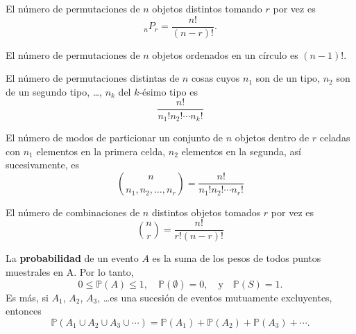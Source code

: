 \begin{theorem}[]
El número de permutaciones de $n$ objetos distintos tomando $r$ por vez es
\begin{equation*}
{}_nP_{r}=\frac{n!}{\left(n-r\right)!}.
\end{equation*}
\end{theorem}

\begin{theorem}[]
El número de permutaciones de $n$ objetos ordenados en un círculo es $(n-1)!$.
\end{theorem}

\begin{theorem}[]
El número de permutaciones distintas de $n$ cosas cuyos $n_1$ son de un tipo, $n_2$ son de un segundo tipo, \ldots, $n_k$ del $k$-ésimo tipo es
\begin{equation*}
\frac{n!}{n_1!n_2!\cdots n_k!}
\end{equation*}
\end{theorem}

\begin{theorem}
El número de modos de particionar un conjunto de $n$ objetos dentro de $r$ celadas con $n_1$ elementos en la primera celda, $n_2$ elementos en la segunda, así sucesivamente, es
\begin{equation*}
\binom{n}{n_1,n_2,\ldots,n_r}=\frac{n!}{n_1! n_2! \cdots n_r!}
\end{equation*}
\end{theorem}

\begin{theorem}[]
El número de combinaciones de $n$ distintos objetos tomados $r$ por vez es
\begin{equation*}
\binom{n}{r}=\frac{n!}{r!\left(n-r\right)!}
\end{equation*}
\end{theorem}

\begin{definition}
La \textbf{probabilidad} de un evento $A$ es la suma de los pesos de todos puntos muestrales en A. Por lo tanto,
\begin{equation*}
0\le \mathds{P}\left(A\right)\le 1,\quad\mathds{P}\left(\emptyset\right)=0,\quad\text{y}\quad\mathds{P}\left(S\right)=1.
\end{equation*}
Es más, si $A_1$, $A_2$, $A_3$, \ldots es una sucesión de eventos mutuamente excluyentes, entonces
\begin{equation*}
\mathds{P}\left(A_{1}\cup A_{2}\cup A_{3}\cup\cdots\right)=\mathds{P}\left(A_{1}\right)+\mathds{P}\left(A_{2}\right)+\mathds{P}\left(A_{3}\right)+\cdots.
\end{equation*}
\end{definition}

